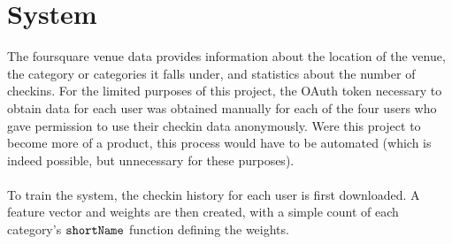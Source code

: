 \documentclass[11pt]{article}
\begin{document}
\section{System}
The foursquare venue data provides information about the location of the venue, the category or categories it falls under, and statistics
about the number of checkins. For the limited purposes of this project, the OAuth token necessary to obtain data for each user was 
obtained manually for each of the four users who gave permission to use their checkin data anonymously. Were this project to become 
more of a product, this process would have to be automated (which is indeed possible, but unnecessary for these purposes).\\ 
\\
To train the system, the checkin history for each user is first downloaded. A feature vector and weights are then created, with a simple
count of each category's $\tt{shortName}$ function defining the weights.
\end{document}
